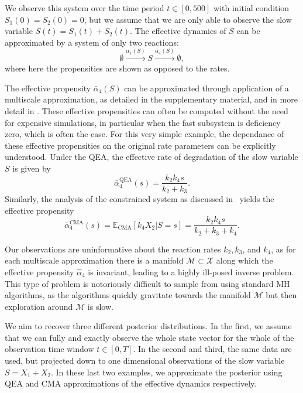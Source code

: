 \documentclass[final]{siamltex}
\newcommand{\edit}[1]{{\color{red} #1}}
\begin{document}
We observe this system over the time period $t \in [0,500]$ with
initial condition $S_1(0) = S_2(0) = 0$, but we assume that we are only able to observe
the slow variable $S(t) = S_1(t) + S_2(t)$. 
The effective dynamics of $S$ can be approximated by a system of only
two reactions:
\begin{equation}\label{eqn:QSSA_system}
	\emptyset \xrightarrow{\alpha_1(S)} S \xrightarrow{\bar{\alpha}_4(S)} \emptyset,
\end{equation}
where here the propensities are shown as opposed to the rates.

The effective propensity $\bar{\alpha}_4(S)$ can be  approximated through
application of a multiscale approximation, as detailed in \edit{the
  supplementary material}, and in more detail in \cite{cotter2016constrained}. These effective
propensities can often be computed without the need for expensive
simulations, in particular when the fast subsystem is deficiency zero,
which is often the case\cite{anderson2010product,anderson2016product}. For this very
simple example, the dependance of these effective
propensities on the original rate parameters can be explicitly
understood. Under the QEA,
the effective rate of degradation of the slow variable $S$ is given by
\begin{equation}
	\bar{\alpha}_4^{\text{QEA}}(s) = \frac{k_2k_4s}{k_2+k_3}.
\end{equation}
Similarly, the analysis of the constrained system as discussed in~\cite{cotter2016constrained} yields the effective propensity
\begin{equation}\label{eqn:chem_CMA_rate}
	\bar{\alpha}_4^{\text{CMA}}(s) = \mathbb{E}_{\text{CMA}}\left[k_4X_2|S=s\right] = \frac{k_2k_4s}{k_2+k_3+k_4}.
\end{equation}

Our observations are uninformative about the reaction rates $k_2,
k_3$, and $k_4$, as for each multiscale approximation there
is a manifold $\mathcal{M} \subset \mathcal{X}$ along which the effective propensity
$\hat{\alpha}_4$ is invariant, leading to a highly ill-posed inverse
problem. This type of problem is notoriously difficult to
sample from using standard MH algorithms, as the algorithms quickly
gravitate towards the manifold $\mathcal{M}$ but then
exploration around $\mathcal{M}$ is slow.

We aim to recover three different posterior distributions. In the
first, we assume that we can fully and exactly observe the whole state
vector for the whole of the observation time window $t \in [0,T]$. In
the second and
third, the same data are used, but projected down to one dimensional observations of the slow
variable $S = X_1 + X_2$. In these last two examples, we approximate the
posterior using QEA and CMA approximations of the
effective dynamics respectively.
\end{document}
